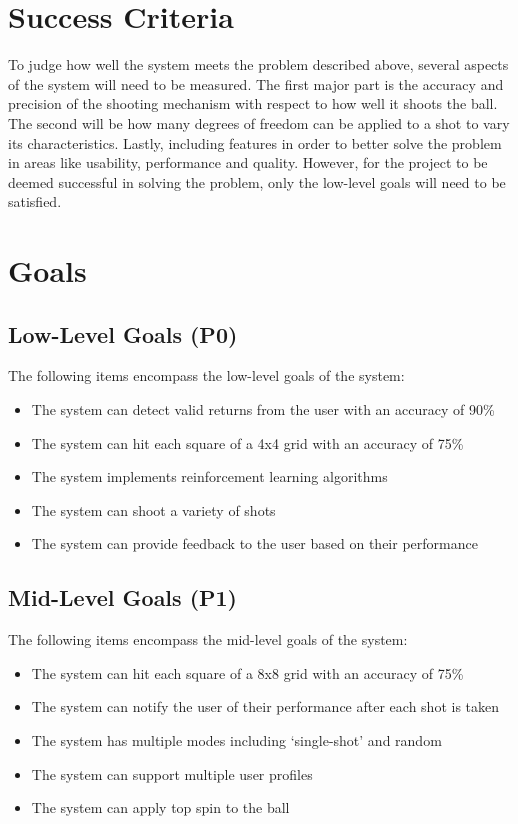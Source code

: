 \documentclass[11pt]{article}
\begin{document}
\section{Success Criteria}
To judge how well the system meets the problem described above, several aspects of the system will need to be measured. The first major part is the accuracy and precision of the shooting mechanism with respect to how well it shoots the ball. The second will be how many degrees of freedom can be applied to a shot to vary its characteristics. Lastly, including features in order to better solve the problem in areas like usability, performance and quality. However, for the project to be deemed successful in solving the problem, only the low-level goals will need to be satisfied. 
\section{Goals}
\subsection{Low-Level Goals (P0)}
The following items encompass the low-level goals of the system:
\begin{itemize}
\item The system can detect valid returns from the user with an accuracy of 90\%
\item The system can hit each square of a 4x4 grid with an accuracy of 75\%
\item The system implements reinforcement learning algorithms
\item The system can shoot a variety of shots 
\item The system can provide feedback to the user based on their performance
\end{itemize}
\subsection{Mid-Level Goals (P1)}
The following items encompass the mid-level goals of the system:
\begin{itemize}
\item The system can hit each square of a 8x8 grid with an accuracy of 75\%
\item The system can notify the user of their performance after each shot is taken
\item The system has multiple modes including `single-shot' and random
\item The system can support multiple user profiles
\item The system can apply top spin to the ball
\end{itemize}
\end{document}
